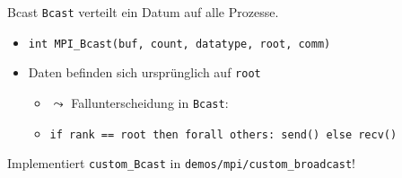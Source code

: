 \documentclass{beamer}
\begin{document}
\begin{frame}{Bcast}
	\texttt{Bcast} verteilt ein Datum auf alle Prozesse.

	\begin{figure}
	\end{figure}

	\begin{itemize}
		\item {\footnotesize \texttt{int MPI\_Bcast(buf, count, datatype, root, comm)}}
		\item Daten befinden sich ursprünglich auf \texttt{root} 
		\begin{itemize}
			\item $\leadsto$ Fallunterscheidung in \texttt{Bcast}:
			\item {\footnotesize \texttt{if rank == root then forall others: send() else recv()}}
		\end{itemize}
	\end{itemize}

	\pause
	Implementiert \texttt{custom\_Bcast} in \texttt{demos/mpi/custom\_broadcast}!
\end{frame}
\end{document}
